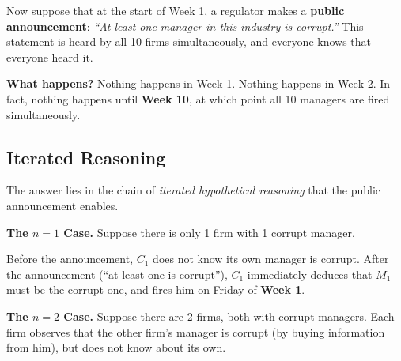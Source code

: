 Now suppose that at the start of Week 1, a regulator makes a \textbf{public announcement}: \textit{``At least one manager in this industry is corrupt.''} This statement is heard by all 10 firms simultaneously, and everyone knows that everyone heard it.

\medskip
\noindent\textbf{What happens?} Nothing happens in Week 1. Nothing happens in Week 2. In fact, nothing happens until \textbf{Week 10}, at which point all 10 managers are fired simultaneously.


\subsection{Iterated Reasoning}

The answer lies in the chain of \textit{iterated hypothetical reasoning} that the public announcement enables.

\medskip
\noindent\textbf{The $n = 1$ Case.}
Suppose there is only 1 firm with 1 corrupt manager.

\begin{center}
\end{center}

Before the announcement, $C_1$ does not know its own manager is corrupt. After the announcement (``at least one is corrupt''), $C_1$ immediately deduces that $M_1$ must be the corrupt one, and fires him on Friday of \textbf{Week 1}.

\medskip
\noindent\textbf{The $n = 2$ Case.}
Suppose there are 2 firms, both with corrupt managers. Each firm observes that the other firm's manager is corrupt (by buying information from him), but does not know about its own.

\begin{center}
\end{center}

